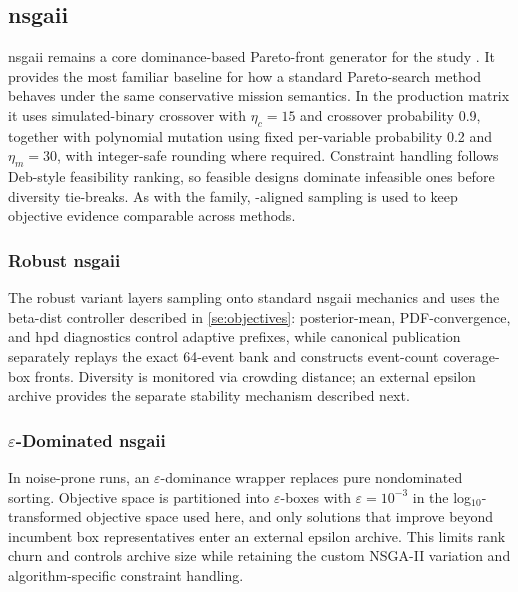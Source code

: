     \subsection{\gls{nsgaii}} \label{ss:nsga2}
        \gls{nsgaii} remains a core dominance-based Pareto-front generator for the study \cite{deb2002nsgaii}. It provides the most familiar baseline for how a standard Pareto-search method behaves under the same conservative mission semantics. In the production matrix it uses simulated-binary crossover with \(\eta_c=15\) and crossover probability 0.9, together with polynomial mutation using fixed per-variable probability 0.2 and \(\eta_m=30\), with integer-safe rounding where required. Constraint handling follows Deb-style feasibility ranking, so feasible designs dominate infeasible ones before diversity tie-breaks. As with the  family, -aligned sampling is used to keep objective evidence comparable across methods.

    \subsubsection{Robust \gls{nsgaii}} \label{ss:nsgarobust}
        The robust variant layers  sampling onto standard \gls{nsgaii} mechanics and uses the beta-dist controller described in \cref{se:objectives}: posterior-mean, PDF-convergence, and \gls{hpd} diagnostics control adaptive prefixes, while canonical publication separately replays the exact 64-event bank and constructs event-count coverage-box fronts. Diversity is monitored via crowding distance; an external epsilon archive provides the separate stability mechanism described next.

    \subsubsection{\texorpdfstring{$\varepsilon$}{epsilon}-Dominated \gls{nsgaii}} \label{ss:epsnsgarobust}
        In noise-prone runs, an $\varepsilon$-dominance wrapper replaces pure nondominated sorting. Objective space is partitioned into $\varepsilon$-boxes with \(\varepsilon=10^{-3}\) in the log\(_{10}\)-transformed objective space used here, and only solutions that improve beyond incumbent box representatives enter an external epsilon archive. This limits rank churn and controls archive size while retaining the custom NSGA-II variation and algorithm-specific constraint handling.

